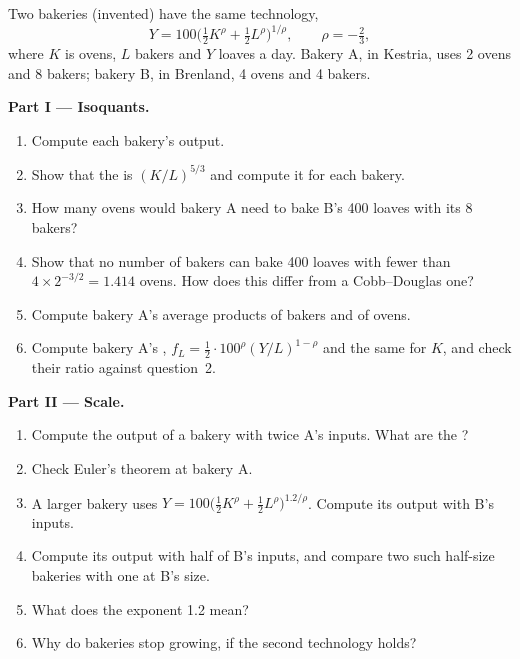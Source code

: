 \begin{problem}\label{pb:b1:technology:bakeries}
Two bakeries (invented) have the same technology,
\[
Y = 100\bigl(\tfrac12K^\rho + \tfrac12L^\rho\bigr)^{1/\rho},\qquad \rho = -\tfrac23,
\]
where $K$ is ovens, $L$ bakers and $Y$ loaves a day. Bakery A, in Kestria,
uses 2 ovens and 8 bakers; bakery B, in Brenland, 4 ovens and 4 bakers.

\medskip\noindent\textbf{Part I --- Isoquants.}
\begin{enumerate}
  \item Compute each bakery's output.
  \item Show that the  is $(K/L)^{5/3}$ and compute it for each bakery.
  \item How many ovens would bakery A need to bake B's 400 loaves with its 8 bakers?
  \item Show that no number of bakers can bake 400 loaves with fewer than $4 \times 2^{-3/2} = 1.414$ ovens. How does this  differ from a Cobb--Douglas one?
  \item Compute bakery A's average products of bakers and of ovens.
  \item Compute bakery A's , $f_L = \tfrac12 \cdot 100^\rho(Y/L)^{1-\rho}$ and the same for $K$, and check their ratio against question~2.
\end{enumerate}

\medskip\noindent\textbf{Part II --- Scale.}
\begin{enumerate}[resume]
  \item Compute the output of a bakery with twice A's inputs. What are the ?
  \item Check Euler's theorem at bakery A.
  \item A larger bakery uses $Y = 100\bigl(\tfrac12K^\rho + \tfrac12L^\rho\bigr)^{1.2/\rho}$. Compute its output with B's inputs.
  \item Compute its output with half of B's inputs, and compare two such half-size bakeries with one at B's size.
  \item What does the exponent 1.2 mean?
  \item Why do bakeries stop growing, if the second technology holds?
\end{enumerate}


\end{problem}
